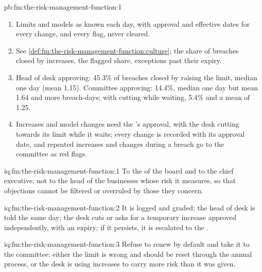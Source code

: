 \begin{solution}{pb:fm:the-risk-management-function:1}
\begin{enumerate}
fifth without any change in the position.
\item Limits and models as known each day, with approval and effective dates for every change, and every flag, never cleared.
\item See \cref{def:fm:the-risk-management-function:culture}; the share of breaches closed by increases, the flagged share, exceptions past their
expiry.
\item Head of desk approving: 45.3\% of breaches closed by raising the limit, median one day (mean 1.15). Committee approving: 14.4\%, median one
day but mean 1.64 and more breach-days; with cutting while waiting, 5.4\% and a mean of 1.25.
\item Increases and model changes need the 's approval, with the desk cutting towards its limit while it waits; every change is
recorded with its approval date, and repeated increases and changes during a breach go to the committee as red flags.
\end{enumerate}
\end{solution}

\begin{solution}{iq:fm:the-risk-management-function:1}
To the  of the board and to the chief executive, not to the head of the businesses whose risk it measures, so that objections cannot
be filtered or overruled by those they concern.
\end{solution}

\begin{solution}{iq:fm:the-risk-management-function:2}
It is logged and graded; the head of desk is told the same day; the desk cuts or asks for a temporary increase approved independently, with an
expiry; if it persists, it is escalated to the .
\end{solution}

\begin{solution}{iq:fm:the-risk-management-function:3}
Refuse to renew by default and take it to the committee: either the limit is wrong and should be reset through the annual process, or the desk is
using increases to carry more risk than it was given.
\end{solution}

